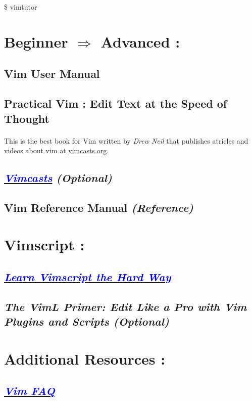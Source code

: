 \documentclass[12pt, a4paper]{article}
\begin{document}
\begin{large}
\begin{center}
	\$ vimtutor
\end{center}
\end{large}

\section{Beginner $\Rightarrow$ Advanced :}
\subsection*{Vim User Manual}
\subsection*{Practical Vim : Edit Text at the Speed of Thought}
\paragraph{}
This is the best book for Vim written by \emph{Drew Neil} that publishes atricles and videos about vim at \url{vimcasts.org}.
\subsection*{\href{http://vimcasts.org/episodes}{\textcolor{blue}{\emph{Vimcasts}}} \emph{(Optional)}}
\subsection*{Vim Reference Manual \emph{(Reference)\\}}

\section{Vimscript :}
\subsection*{\href{https://learnvimscriptthehardway.stevelosh.com}{\textcolor{blue}{\emph{Learn Vimscript the Hard Way}}}}
\subsection*{\emph{The VimL Primer: Edit Like a Pro with Vim Plugins and Scripts (Optional)}\\}

\section{Additional Resources :}
\subsection*{\href{https://vimhelp.org/vim_faq.txt.html}{\textcolor{blue}{\emph{Vim FAQ}}}}
\end{document}
